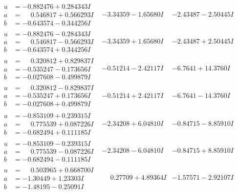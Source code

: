 \documentclass[1p]{elsarticle_modified}
\theoremstyle{definition}
\begin{document}
$$\begin{array}{c|c|c}
\begin{aligned}
u &= -0.882476 + 0.284343 I \\
a &= \phantom{-}0.546817 + 0.566293 I \\
b &= -0.643574 - 0.344256 I\end{aligned}
 & -3.34359 - 1.65680 I & -2.43487 - 2.50445 I \\ \hline\begin{aligned}
u &= -0.882476 - 0.284343 I \\
a &= \phantom{-}0.546817 - 0.566293 I \\
b &= -0.643574 + 0.344256 I\end{aligned}
 & -3.34359 + 1.65680 I & -2.43487 + 2.50445 I \\ \hline\begin{aligned}
u &= \phantom{-}0.320812 + 0.829837 I \\
a &= -0.535247 - 0.173656 I \\
b &= -0.027608 - 0.499879 I\end{aligned}
 & -0.51214 - 2.42117 I & -6.7641 + 14.3760 I \\ \hline\begin{aligned}
u &= \phantom{-}0.320812 - 0.829837 I \\
a &= -0.535247 + 0.173656 I \\
b &= -0.027608 + 0.499879 I\end{aligned}
 & -0.51214 + 2.42117 I & -6.7641 - 14.3760 I \\ \hline\begin{aligned}
u &= -0.853109 + 0.239315 I \\
a &= \phantom{-}0.775539 + 0.087226 I \\
b &= -0.682494 + 0.111185 I\end{aligned}
 & -2.34208 + 6.04810 I & -0.84715 - 8.85910 I \\ \hline\begin{aligned}
u &= -0.853109 - 0.239315 I \\
a &= \phantom{-}0.775539 - 0.087226 I \\
b &= -0.682494 - 0.111185 I\end{aligned}
 & -2.34208 - 6.04810 I & -0.84715 + 8.85910 I \\ \hline\begin{aligned}
u &= \phantom{-}0.503965 + 0.668700 I \\
a &= -1.30449 + 1.23303 I \\
b &= -1.48195 - 0.25091 I\end{aligned}
 & \phantom{-}0.27709 + 4.89364 I & -1.57571 - 2.92107 I \\ \hline\begin{aligned}

\end{aligned}
\end{array}$$
\end{document}
